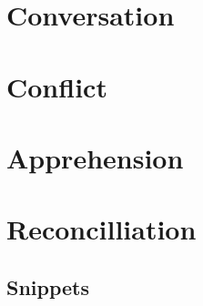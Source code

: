 \documentclass[10pt]{memoir}
\begin{document}
  \part{Conversation}
  \vfill

  
  

  

  \renewcommand*{\theHpart}{conflict}
  \part{Conflict}
  \vfill

  \renewcommand*{\theHpart}{apprehension}
  \part{Apprehension}
  \vfill

  \renewcommand*{\theHpart}{reconcilliation}
  \part{Reconcilliation}
  \vfill

  \chapter*{Snippets}
  
  


%  

  \backmatter

  \markboth{}{}
\end{document}
